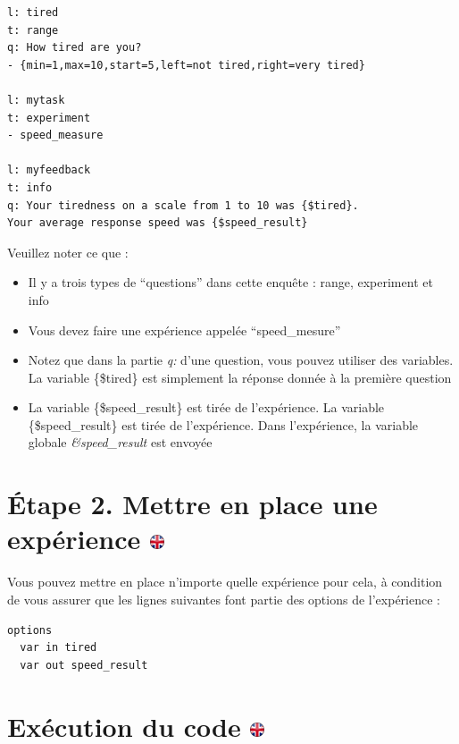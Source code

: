 \documentclass[
]{book}
\providecommand{\tightlist}{%
  \setlength{\itemsep}{0pt}\setlength{\parskip}{0pt}}
\begin{document}
\begin{verbatim}
l: tired
t: range
q: How tired are you?
- {min=1,max=10,start=5,left=not tired,right=very tired}

l: mytask
t: experiment
- speed_measure

l: myfeedback
t: info
q: Your tiredness on a scale from 1 to 10 was {$tired}.
Your average response speed was {$speed_result}
\end{verbatim}

Veuillez noter ce que :

\begin{itemize}
\tightlist
\item
  Il y a trois types de ``questions'' dans cette enquête : range, experiment et info
\item
  Vous devez faire une expérience appelée ``speed\_mesure''
\item
  Notez que dans la partie \emph{q:} d'une question, vous pouvez utiliser des variables. La variable \{\$tired\} est simplement la réponse donnée à la première question
\item
  La variable \{\$speed\_result\} est tirée de l'expérience. La variable \{\$speed\_result\} est tirée de l'expérience. Dans l'expérience, la variable globale \emph{\&speed\_result} est envoyée
\end{itemize}

\hypertarget{uxe9tape-2.-mettre-en-place-une-expuxe9rience}{%
\section[Étape 2. Mettre en place une expérience ]{\texorpdfstring{Étape 2. Mettre en place une expérience \href{https://www.psytoolkit.org/lessons/var_in_out.html\#_step_2_setup_an_experiment}{\protect\includegraphics{img/ukflag.png}}}{Étape 2. Mettre en place une expérience }}\label{uxe9tape-2.-mettre-en-place-une-expuxe9rience}}

Vous pouvez mettre en place n'importe quelle expérience pour cela, à condition de vous assurer que les lignes suivantes font partie des options de l'expérience :

\begin{verbatim}
options
  var in tired
  var out speed_result
\end{verbatim}

\hypertarget{exuxe9cution-du-code}{%
\section[Exécution du code ]{\texorpdfstring{Exécution du code \href{https://www.psytoolkit.org/lessons/var_in_out.html\#_running_the_code}{\protect\includegraphics{img/ukflag.png}}}{Exécution du code }}\label{exuxe9cution-du-code}}
\end{document}
